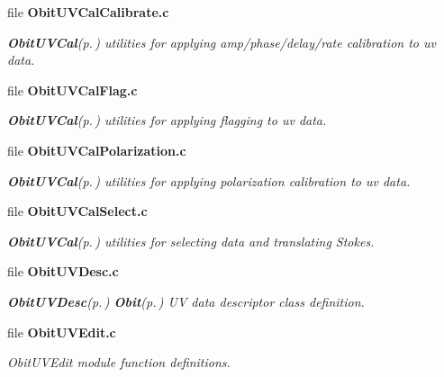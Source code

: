 \begin{CompactItemize}
\item 
file {\bf Obit\-UVCal\-Calibrate.c}
\begin{CompactList}\small\item\em {\bf Obit\-UVCal}{\rm (p.\,\pageref{structObitUVCal})} utilities for applying amp/phase/delay/rate calibration to uv data. \item\end{CompactList}

\item 
file {\bf Obit\-UVCal\-Flag.c}
\begin{CompactList}\small\item\em {\bf Obit\-UVCal}{\rm (p.\,\pageref{structObitUVCal})} utilities for applying flagging to uv data. \item\end{CompactList}

\item 
file {\bf Obit\-UVCal\-Polarization.c}
\begin{CompactList}\small\item\em {\bf Obit\-UVCal}{\rm (p.\,\pageref{structObitUVCal})} utilities for applying polarization calibration to uv data. \item\end{CompactList}

\item 
file {\bf Obit\-UVCal\-Select.c}
\begin{CompactList}\small\item\em {\bf Obit\-UVCal}{\rm (p.\,\pageref{structObitUVCal})} utilities for selecting data and translating Stokes. \item\end{CompactList}

\item 
file {\bf Obit\-UVDesc.c}
\begin{CompactList}\small\item\em {\bf Obit\-UVDesc}{\rm (p.\,\pageref{structObitUVDesc})} {\bf Obit}{\rm (p.\,\pageref{structObit})} UV data descriptor class definition. \item\end{CompactList}

\item 
file {\bf Obit\-UVEdit.c}
\begin{CompactList}\small\item\em Obit\-UVEdit module function definitions. \item\end{CompactList}


\end{CompactItemize}
